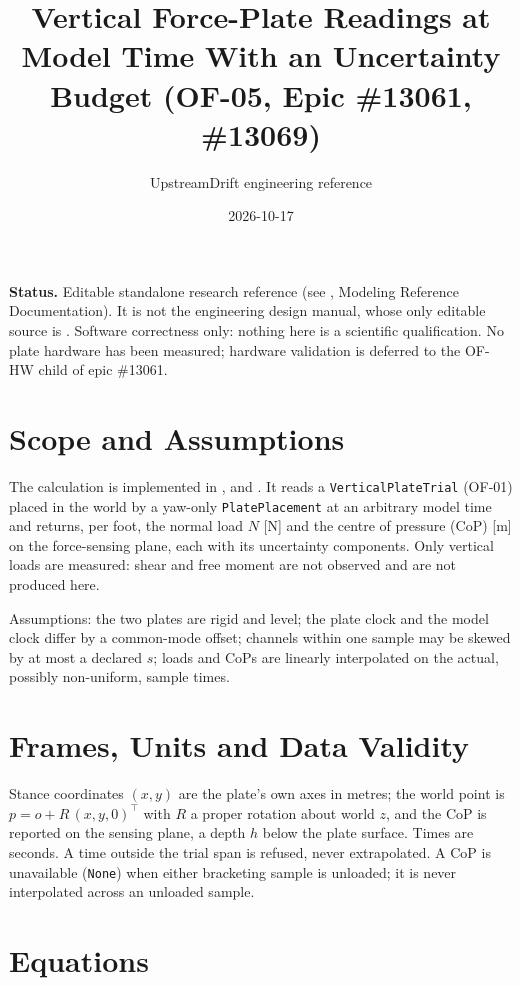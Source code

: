 \documentclass[11pt]{article}
\title{Vertical Force-Plate Readings at Model Time With an Uncertainty Budget (OF-05, Epic \#13061, \#13069)}
\author{UpstreamDrift engineering reference}
\date{2026-10-17}
\begin{document}
\maketitle

\noindent\textbf{Status.} Editable standalone research reference (see
, Modeling Reference Documentation). It is not the
engineering design manual, whose only editable source is
. Software correctness only: nothing here is a
scientific qualification. No plate hardware has been measured; hardware
validation is deferred to the OF-HW child of epic \#13061.

\section{Scope and Assumptions}

The calculation is implemented in
,
 and . It reads a
\texttt{VerticalPlateTrial} (OF-01) placed in the world by a yaw-only
\texttt{PlatePlacement} at an arbitrary model time and returns, per foot,
the normal load $N$ [N] and the centre of pressure (CoP) [m] on the
force-sensing plane, each with its uncertainty components. Only vertical
loads are measured: shear and free moment are not observed and are not
produced here.

Assumptions: the two plates are rigid and level; the plate clock and the
model clock differ by a common-mode offset; channels within one sample may
be skewed by at most a declared $s$; loads and CoPs are linearly
interpolated on the actual, possibly non-uniform, sample times.

\section{Frames, Units and Data Validity}

Stance coordinates $(x, y)$ are the plate's own axes in metres; the world
point is $p = o + R\,(x, y, 0)^\top$ with $R$ a proper rotation about world
$z$, and the CoP is reported on the sensing plane, a depth $h$ below the
plate surface. Times are seconds. A time outside the trial span is refused,
never extrapolated. A CoP is unavailable (\texttt{None}) when either
bracketing sample is unloaded; it is never interpolated across an unloaded
sample.

\section{Equations}
\end{document}
